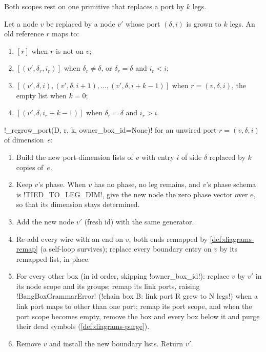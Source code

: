 Both scopes rest on one primitive that replaces a port by $k$ legs.

\begin{definition}\label{def:diagrams-remap}
Let a node $v$ be replaced by a node $v'$ whose port $(\delta,i)$ is grown to $k$ legs. An old reference $r$ maps to:
\begin{enumerate}
\item $[r]$ when $r$ is not on $v$;
\item $[(v',\delta_r,i_r)]$ when $\delta_r\ne\delta$, or $\delta_r=\delta$ and $i_r<i$;
\item $[(v',\delta,i),(v',\delta,i+1),\dots,(v',\delta,i+k-1)]$ when $r=(v,\delta,i)$, the empty list when $k=0$;
\item $[(v',\delta,i_r+k-1)]$ when $\delta_r=\delta$ and $i_r>i$.
\end{enumerate}
\end{definition}

\begin{algorithm}\label{alg:diagrams-regrow}
\py!_regrow_port(D, r, k, owner_box_id=None)! for an unwired port $r=(v,\delta,i)$ of dimension~$e$:
\begin{enumerate}
\item Build the new port-dimension lists of $v$ with entry $i$ of side $\delta$ replaced by $k$ copies of~$e$.
\item Keep $v$'s phase. When $v$ has no phase, no leg remains, and $v$'s phase schema is \code!TIED_TO_LEG_DIM!, give the new node the zero phase vector over $e$, so that its dimension stays determined.
\item Add the new node $v'$ (fresh id) with the same generator.
\item Re-add every wire with an end on $v$, both ends remapped by \cref{def:diagrams-remap} (a self-loop survives); replace every boundary entry on $v$ by its remapped list, in place.
\item For every other box (in id order, skipping \py!owner_box_id!): replace $v$ by $v'$ in its node scope and its groups; remap its link ports, raising \py!BangBoxGrammarError! (\code!chain box B: link port R grew to N legs!) when a link port maps to other than one port; remap its port scope, and when the port scope becomes empty, remove the box and every box below it and purge their dead symbols (\cref{def:diagrams-purge}).
\item Remove $v$ and install the new boundary lists. Return $v'$.
\end{enumerate}
\end{algorithm}

